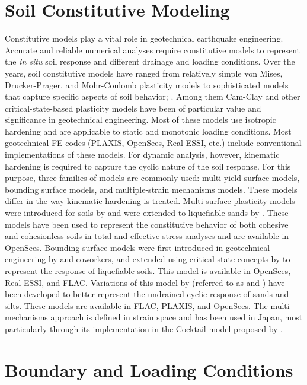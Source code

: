 \section{Soil Constitutive Modeling}
\label{sec:resp_geotech_4}

Constitutive models play a vital role in geotechnical earthquake engineering. Accurate and reliable numerical analyses require constitutive models to represent the \textit{in situ} soil response and different drainage and loading conditions. Over the years, soil constitutive models  have ranged from relatively simple von Mises, Drucker-Prager, and Mohr-Coulomb plasticity models to sophisticated models that capture specific aspects of soil behavior; \cite[see][]{Borja2013}. Among them Cam-Clay and other critical-state-based plasticity models have been of particular value and significance in geotechnical engineering. Most of these models use isotropic hardening and are applicable to static and monotonic loading conditions. Most geotechnical FE codes (PLAXIS, OpenSees, Real-ESSI, etc.) include conventional implementations of these models. For dynamic analysis, however, kinematic hardening is required to capture the cyclic nature of the soil response. For this purpose, three families of models are commonly used: multi-yield surface models, bounding surface models, and multiple-strain mechanisms models. These models differ in the way kinematic hardening is treated. Multi-surface plasticity models were introduced for soils by \citet{Prevost77, Prevost85a} and were extended to liquefiable sands by \citet{Elgamal03}. These models have been used to represent the constitutive behavior of both cohesive and cohesionless soils in total and effective stress analyses and are available in OpenSees. Bounding surface models were first introduced in geotechnical engineering by \citet{Dafalias86} and coworkers, and extended using critical-state concepts by \citet{Dafalias04} to represent the response of liquefiable soils. This model is available in OpenSees, Real-ESSI, and FLAC. Variations of this model by \citet{boulanger2017pm4sand, boulanger2018pm4silt} (referred to as  and ) have been developed to better represent the undrained cyclic response of sands and silts. These models are available in FLAC, PLAXIS, and OpenSees. The multi-mechanisms approach is defined in strain space and has been used in Japan, most particularly through its implementation in the Cocktail model proposed by \citet{iai2011dilatancy, iai2013finite}.

\section{Boundary and Loading Conditions}
\label{sec:resp_geotech_5}

